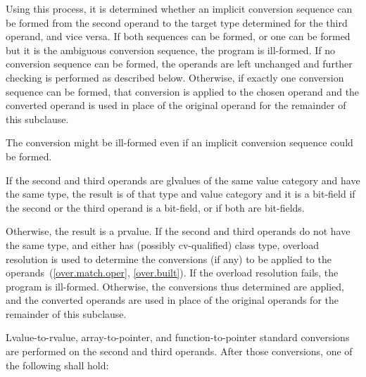 Using this process, it is determined whether an implicit conversion
sequence can be formed from the second operand
to the target type determined for the third operand, and vice versa.
If both sequences can be formed, or one can be formed but it is the
ambiguous conversion sequence, the program is ill-formed.
If no conversion sequence can be formed, the operands are left unchanged
and further checking is performed as described below.
Otherwise, if exactly one conversion sequence can be formed,
that conversion is applied to the chosen operand
and the converted operand is used in place of the original operand for
the remainder of this subclause.
\begin{note}
The conversion might be ill-formed even if an implicit conversion
sequence could be formed.
\end{note}

\pnum
If the second and third operands are glvalues of the same value category
and have the same type, the
result is of that type and value category and it is a bit-field if the
second or the third operand is a bit-field, or if both are bit-fields.

\pnum
Otherwise, the result is a prvalue. If the second and third operands do
not have the same type, and either has (possibly cv-qualified) class
type, overload resolution is used to determine the conversions (if any)
to be applied to the operands~(\ref{over.match.oper}, \ref{over.built}).
If the overload resolution fails, the program is ill-formed. Otherwise,
the conversions thus determined are applied, and the converted operands
are used in place of the original operands for the remainder of this
subclause.

\pnum
Lvalue-to-rvalue, array-to-pointer,
and function-to-pointer standard conversions are
performed on the second and third operands. After those conversions, one
of the following shall hold:

